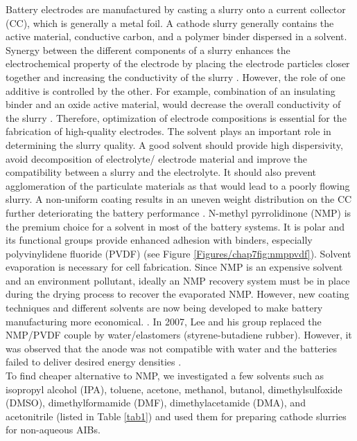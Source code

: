 Battery electrodes are manufactured by casting a slurry onto a current collector (CC), which is generally a metal foil. A cathode slurry generally contains the active material, conductive carbon, and a polymer binder dispersed in a solvent. Synergy between the different components of a slurry enhances the electrochemical property of the electrode by placing the electrode particles closer together and increasing the conductivity of the slurry \cite{zheng_cooperation_2012}.
However, the role of one additive is controlled by the other. For example, combination of an insulating binder and an oxide active material, would decrease the overall conductivity of the slurry \cite{guy_novel_2006, seki_effect_2004}. Therefore, optimization of electrode compositions is essential for the fabrication of high-quality electrodes. The solvent plays an important role in determining the slurry quality. A good solvent should provide high dispersivity, avoid decomposition of electrolyte/ electrode material and improve the compatibility between a slurry and the electrolyte. It should also prevent agglomeration of the particulate materials as that would lead to a poorly flowing slurry. A non-uniform coating results in an uneven weight distribution on the CC further deteriorating the battery performance \cite{ludwig_solvent-free_2016}. N-methyl pyrrolidinone (NMP) is the premium choice for a solvent in most of the battery systems. It is polar and its functional groups provide enhanced adhesion with binders, especially polyvinylidene fluoride (PVDF) (see Figure \ref{Figures/chap7fig:nmppvdf}). Solvent evaporation is necessary for cell fabrication. Since NMP is an expensive solvent and an environment pollutant, ideally an NMP recovery system must be in place during the drying process to recover the evaporated NMP. However, new coating techniques and different solvents are now being developed to make battery manufacturing more economical. \cite{liu_effective_2014,spreafico_pvdf_2014, liu_effects_2008, lee_effect_2010, wenzel_challenges_2015, lee_selection_2017, stein_non-aqueous_2016}. In 2007, Lee and his group replaced the NMP/PVDF couple by water/elastomers (styrene-butadiene rubber). However, it was observed that the anode was not compatible with water and the batteries failed to deliver desired energy densities \cite{lee_novel_2007, li_effects_2005}. \\
To find cheaper alternative to NMP, we investigated a few solvents such as isopropyl alcohol (IPA), toluene, acetone, methanol, butanol, dimethylsulfoxide (DMSO), dimethylformamide (DMF), dimethylacetamide (DMA), and acetonitrile (listed in Table \ref{tab1}) and used them for preparing cathode slurries for non-aqueous AIBs. 

